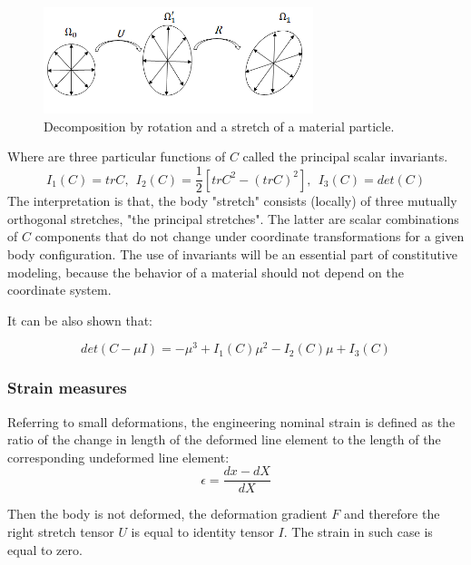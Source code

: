 \begin{figure}
\begin{center}
\includegraphics[width=0.7\textwidth,keepaspectratio]{figures/deformationTensorDecomposition.png} 
\caption[]{Decomposition by rotation and a stretch of a material particle.  }
\label{deformationGradientDecom}
\end{center}
\end{figure}

Where are three particular functions of $C$ called the principal scalar invariants.
\begin{equation}
\label{principal_invariants}
I_1(C) = tr C, \ \ I_2(C)=\frac{1}{2}\left[ trC^2 - \left(tr C \right)^2 \right], \ \ I_3(C)=det(C) 
\end{equation}
 The interpretation is that, the body "stretch" consists (locally) of three mutually orthogonal stretches, "the principal stretches".  The latter are scalar combinations of $C$ components that do not change under coordinate transformations for a given body configuration. The use of invariants will be an essential part of constitutive modeling, because the behavior of a material should not depend on the coordinate system.

It can be also shown that:

\begin{equation}
det(C-\mu I) = -\mu ^3+I_1(C)\mu ^2-I_2(C)\mu +I_3(C)
\end{equation}


\subsubsection*{Strain measures}\label{strainmeasure}
Referring to small deformations, the engineering nominal strain is defined as the ratio of the change in length of the deformed line element to the length of the corresponding undeformed line element:  
\begin{equation}
\epsilon = \frac{ dx  - dX }{	dX }
\end{equation}

Then the body is not deformed, the deformation gradient $F$ and therefore the right stretch tensor $U$ is equal to identity tensor $I$. The strain in such case is equal to zero. 

